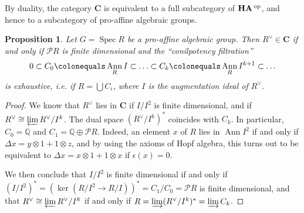 \documentclass{amsart}
\newtheorem{prop}[thm]{Proposition}
\newtheorem{cor}[thm]{Corollary}
\theoremstyle{definition}
\theoremstyle{remark}
\theoremstyle{remark}
\newcommand{\Q}{\mathbb{Q}}
\newcommand{\cat}{\mathbf{C}}%
\newcommand{\ra}{\rightarrow}
\newcommand{\mcG}{\mathcal{G}}
\newcommand{\mcP}{\mathcal{P}}
\newcommand{\mcU}{\mathcal{U}}
\newcommand{\adj}[4]{#1\negmedspace: #2\rightleftarrows #3:\negmedspace #4}
\DeclareMathOperator{\Ann}{Ann}
\DeclareMathOperator{\op}{^{op}}
\DeclareMathOperator{\Spec}{Spec}
\DeclareMathOperator{\Gps}{\bf{Gps}}
\DeclareMathOperator{\HA}{\bf{HA}}
\DeclareMathOperator{\LA}{\bf{LA}}
\DeclareMathOperator{\pUAG}{p\bf{UAG}}
\begin{document}

%

By duality, the category  $\cat$ is equivalent to a full subcategory of $\HA\op$, and hence to a subcategory of pro-affine algebraic groups.

\begin{prop}
Let $G=\Spec R$ be a pro-affine algebraic group. Then $R^\vee\in\cat$ if and only if $\mcP R$ is finite dimensional and the ``conilpotency filtration''
\begin{equation}\label{cf}
0\subset C_0\colonequals\Ann_R I\subset\ldots\subset C_k\colonequals\Ann_R I^{k+1}\subset\ldots
\end{equation}
is exhaustive, i.e. if $R=\bigcup C_i$, where $I$ is the augmentation ideal of $R^\vee$.
\end{prop}

\begin{proof}
We know that $R^\vee$ lies in $\cat$ if $I/I^2$ is finite dimensional, and if $R^\vee\cong\varprojlim R^\vee/I^k$. The dual space $(R^\vee/I^k)^*$ coincides with $C_k$. In particular, $C_0=\Q$ and $C_1=\Q\oplus\mcP R$. Indeed, an element $x$ of $R$ lies in $\Ann I^2$ if and only if $\Delta x=y\otimes 1+1\otimes z$, and by using the axioms of Hopf algebra, this turns out to be equivalent to $\Delta x=x\otimes 1+1\otimes x$ if $\epsilon(x)=0$.

We then conclude that $I/I^2$ is finite dimensional if and only if $(I/I^2)^*=(\ker (R/I^2\ra R/I))^*=C_1/C_0=\mcP R$ is finite dimensional, and that $R^\vee\cong\varprojlim R^\vee/I^k$ if and only if $R=\varinjlim(R^\vee/I^k)^*=\varinjlim C_k$.
\end{proof}
\end{document}
